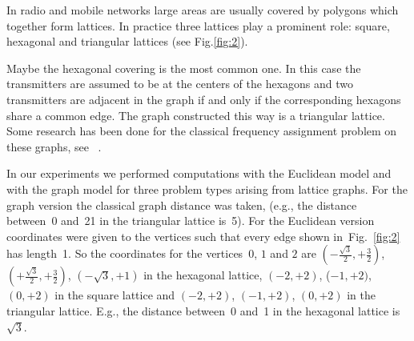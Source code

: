 \documentclass[smallextended]{svjour3}
\begin{document}
In radio and mobile networks large areas are usually covered by polygons 
which together form lattices. In practice three lattices play a prominent 
role: square, hexagonal and triangular lattices (see Fig.\ref{fig:2}). 

 

Maybe the hexagonal covering is the most common one. In this case the transmitters are assumed to be at the centers of the hexagons 
and two transmitters are adjacent in the graph 
if and only if the corresponding hexagons share a common 
edge. The graph constructed this way is a triangular lattice. 
Some research has been done for the classical frequency assignment problem on these graphs, see ~\cite{hex1,hex2,hex3,hex4,hex5}.


In our experiments we performed computations with the Euclidean model and with 
the graph model for three problem types arising from lattice graphs.  For the graph version the classical graph distance was taken, 
(e.g., the distance between~0 and~21 in the triangular lattice is~5). 
For the Euclidean version coordinates were given to the vertices such 
that every edge shown in~Fig.~\ref{fig:2} has length~1. 
So the coordinates for the vertices~$0$, $1$ and $2$ are 
$(-\frac{\sqrt{3}}{2},+\frac{3}{2})$, $(+\frac{\sqrt{3}}{2},+\frac{3}{2})$, 
$(-\sqrt{3},+1)$ in the hexagonal lattice, 
$(-2,+2)$, ($-1,+2)$, $(0,+2)$ in the square lattice and 
$(-2,+2)$, $(-1,+2)$, $(0,+2)$ in the triangular lattice. 
E.g., the distance between~0 and~1 in the hexagonal lattice is~$\sqrt{3}$. 
\end{document}
